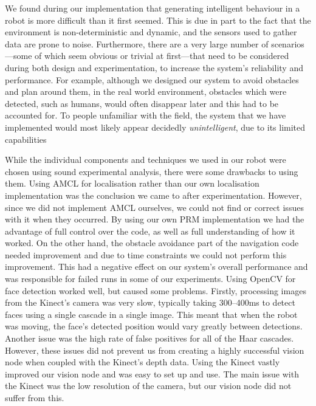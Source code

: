 \documentclass[conference]{IEEEtran}
\begin{document}
We found during our implementation that generating intelligent behaviour in a robot is more difficult than it first seemed. This is due in part to the fact that the environment is non-deterministic and dynamic, and the sensors used to gather data are prone to noise. Furthermore, there are a very large number of scenarios---some of which seem obvious or trivial at first---that need to be considered during both design and experimentation, to increase the system's reliability and performance. For example, although we designed our system to avoid obstacles and plan around them, in the real world environment, obstacles which were detected, such as humans, would often disappear later and this had to be accounted for. To people unfamiliar with the field, the system that we have implemented would most likely appear decidedly \emph{unintelligent}, due to its limited capabilities

While the individual components and techniques we used in our robot were chosen using sound experimental analysis, there were some drawbacks to using them. Using AMCL for localisation rather than our own localisation implementation was the conclusion we came to after experimentation. However, since we did not implement AMCL ourselves, we could not find or correct issues with it when they occurred. By using our own PRM implementation we had the advantage of full control over the code, as well as full understanding of how it worked. On the other hand, the obstacle avoidance part of the navigation code needed improvement and due to time constraints we could not perform this improvement. This had a negative effect on our system's overall performance and was responsible for failed runs in some of our experiments. Using OpenCV for face detection worked well, but caused some problems. Firstly, processing images from the Kinect's camera was very slow, typically taking 300--400ms to detect faces using a single cascade in a single image. This meant that when the robot was moving, the face's detected position would vary greatly between detections. Another issue was the high rate of false positives for all of the Haar cascades. However, these issues did not prevent us from creating a highly successful vision node when coupled with the Kinect's depth data. Using the Kinect vastly improved our vision node and was easy to set up and use. The main issue with the Kinect was the low resolution of the camera, but our vision node did not suffer from this.
\end{document}
